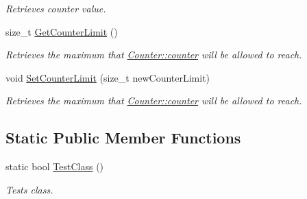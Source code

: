 \begin{DoxyCompactItemize}
\begin{DoxyCompactList}\small\item\em Retrieves counter value. \item\end{DoxyCompactList}\item 
size\_\-t \hyperlink{class_counter_a41a326252ce67d0f6c253b10ce2cab13}{GetCounterLimit} ()
\begin{DoxyCompactList}\small\item\em Retrieves the maximum that \hyperlink{class_counter_a38772b10f98e364586216fe90ebdb194}{Counter::counter} will be allowed to reach. \item\end{DoxyCompactList}\item 
void \hyperlink{class_counter_ac1d85691c6a779969610baea5f38fdca}{SetCounterLimit} (size\_\-t newCounterLimit)
\begin{DoxyCompactList}\small\item\em Retrieves the maximum that \hyperlink{class_counter_a38772b10f98e364586216fe90ebdb194}{Counter::counter} will be allowed to reach. \item\end{DoxyCompactList}\end{DoxyCompactItemize}
\subsection*{Static Public Member Functions}
\begin{DoxyCompactItemize}
\item 
static bool \hyperlink{class_counter_aed38c57480625c16c668fdb4e3021ef4}{TestClass} ()
\begin{DoxyCompactList}\small\item\em Tests class. \item\end{DoxyCompactList}\end{DoxyCompactItemize}
